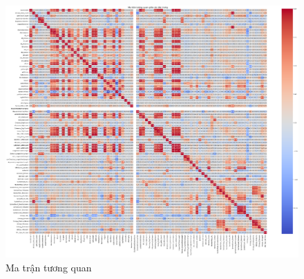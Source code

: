 \documentclass[13pt]{article}
\begin{document}
\newpage
    \begin{figure}[h!]
        \centering        \includegraphics[width=0.7\linewidth]{image/h16.png}
            \caption{Ma trận tương quan}
            \label{fig:label1}
    \end{figure}
\end{document}
